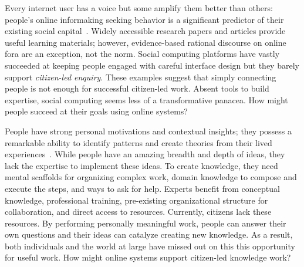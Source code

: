 Every internet user has a voice but some amplify them better than others: people's online informaking seeking behavior is a significant predictor of their existing social capital~\cite{gil2012social}. Widely accessible research papers and articles provide useful learning materials; however, evidence-based rational discourse on online fora are an exception, not the norm. Social computing platforms have vastly succeeded at keeping people engaged with careful interface design but they barely support \textit {citizen-led enquiry}. These examples suggest that simply connecting people is not enough for successful citizen-led work. Absent tools to build expertise, social computing seems less of a transformative panacea. How might people succeed at their goals using online systems?



People have strong personal motivations and contextual insights; they possess a remarkable ability to identify patterns and create theories from their lived experiences~\cite{Gelman2011}. While people have an amazing breadth and depth of ideas, they lack the expertise to implement these ideas. To create knowledge, they need mental scaffolds for organizing complex work, domain knowledge to compose and execute the steps, and ways to ask for help. Experts benefit from conceptual knowledge, professional training, pre-existing organizational structure for collaboration, and direct access to resources. Currently, citizens lack these resources. By performing personally meaningful work, people can answer their own questions and their ideas can catalyze creating new knowledge. As a result, both individuals and the world at large have missed out on this this opportunity for useful work. How might online systems support citizen-led knowledge work? 


